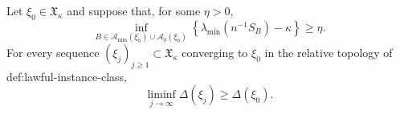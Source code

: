 Let \(\xi_0\in\mathfrak X_\kappa\) and suppose that, for some \(\eta>0\),
\[
\inf_{B\in\mathcal A_{\mathrm{mm}}(\xi_0)\cup\mathcal A_0(\xi_0)}
\left\{\lambda_{\min}(n^{-1}S_B)-\kappa\right\}\ge\eta.
\]
For every sequence \((\xi_j)_{j\ge1}\subset\mathfrak X_\kappa\) converging to \(\xi_0\) in the relative topology of def:lawful-instance-class,
\[
\liminf_{j\to\infty}\Delta(\xi_j)\ge\Delta(\xi_0).
\]